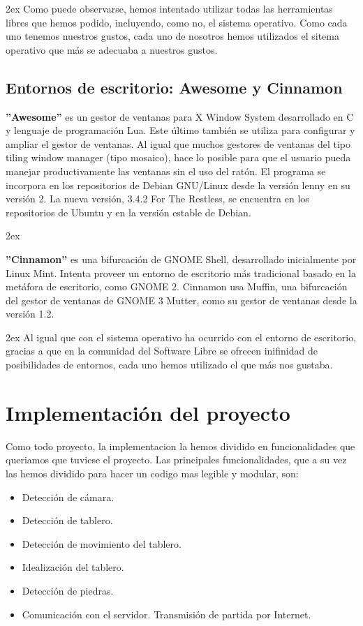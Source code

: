 \documentclass[12pt,a4paper]{report}
\begin{document}
\parskip 2ex
Como puede observarse, hemos intentado utilizar todas las herramientas libres
que hemos podido, incluyendo, como no, el sistema operativo. Como cada uno
tenemos nuestros gustos, cada uno de nosotros hemos utilizados el sitema
operativo que más se adecuaba a nuestros gustos. 


\subsection{Entornos de escritorio: Awesome y Cinnamon}

\textbf{''Awesome''} es un gestor de ventanas para X Window System desarrollado
en C y lenguaje de programación Lua. Este último también se utiliza para
configurar y ampliar el gestor de ventanas. Al igual que muchos gestores de
ventanas del tipo tiling window manager (tipo mosaico), hace lo posible para que
el usuario pueda manejar productivamente las ventanas sin el uso del ratón.  El
programa se incorpora en los repositorios de Debian GNU/Linux desde la versión
lenny en su versión 2. La nueva versión, 3.4.2 For The Restless, se encuentra en
los repositorios de Ubuntu y en la versión estable de Debian.

\parskip 2ex

\textbf{''Cinnamon''} es una bifurcación de GNOME Shell, desarrollado
inicialmente por Linux Mint. Intenta proveer un entorno de escritorio más
tradicional basado en la metáfora de escritorio, como GNOME 2. Cinnamon usa
Muffin, una bifurcación del gestor de ventanas de GNOME 3 Mutter, como su gestor
de ventanas desde la versión 1.2.

\parskip 2ex
Al igual que con el sistema operativo ha ocurrido con el entorno de escritorio,
gracias a que en la comunidad del Software Libre se ofrecen inifinidad de
posibilidades de entornos, cada uno hemos utilizado el que más nos gustaba.

\section {Implementación del proyecto}

Como todo proyecto, la implementacion la hemos dividido en funcionalidades que
queriamos que tuviese el proyecto. Las principales funcionalidades, que a su vez
las hemos dividido para hacer un codigo mas legible y modular, son:
\begin{itemize} 
    \item Detección de cámara.
    \item Detección de tablero.
    \item Detección de movimiento del tablero.
    \item Idealización del tablero.
    \item Detección de piedras.
    \item Comunicación con el servidor. Transmisión de partida por Internet.
\end{itemize}
\end{document}
